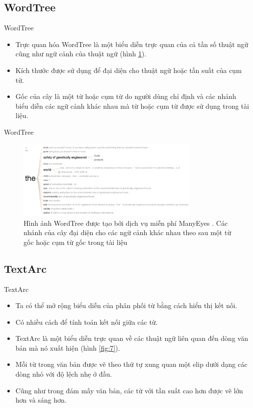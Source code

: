 \documentclass[10pt]{beamer}
\theoremstyle{remark}
\theoremstyle{definition}
\begin{document}
\subsection{WordTree}

\begin{frame}{WordTree}
	\begin{itemize}
		\item Trực quan hóa WordTree \cite{450} là một biểu diễn trực quan của cả tần số thuật ngữ cũng như ngữ cảnh của thuật ngữ (hình \ref{fig:6}).
		\item Kích thước được sử dụng để đại diện cho thuật ngữ hoặc tần suất của cụm từ.
		\item Gốc của cây là một từ hoặc cụm từ do người dùng chỉ định và các nhánh biểu diễn các ngữ cảnh khác nhau mà từ hoặc cụm từ được sử dụng trong tài liệu.
	\end{itemize}
\end{frame}

\begin{frame}{WordTree}
	\begin{figure}[h!]
        \centering
        \includegraphics[width=0.8\textwidth]{6.png}
        \caption{Hình ảnh WordTree được tạo bởi dịch vụ miễn phí ManyEyes \cite{196}.
        Các nhánh của cây đại diện cho các ngữ cảnh khác nhau theo sau một từ gốc hoặc cụm từ gốc trong tài liệu}
        \label{fig:6}
    \end{figure}
\end{frame}

\subsection{TextArc}

\begin{frame}{TextArc}
	\begin{itemize}
		\item Ta có thể mở rộng biểu diễn của phân phối từ bằng cách hiển thị kết nối.
		\item Có nhiều cách để tính toán kết nối giữa các từ.
		\item TextArc \cite{312} là một biểu diễn trực quan về các thuật ngữ liên quan đến dòng văn bản mà nó xuất hiện (hình \ref{fig:7}).
		\item Mỗi từ trong văn bản được vẽ theo thứ tự xung quan một elip dưới dạng các dòng nhỏ với độ lệch nhẹ ở đầu.
		\item Cũng như trong đám mấy văn bản, các từ với tần suất cao hơn được vẽ lớn hơn và sáng hơn.
	\end{itemize}
\end{frame}
\end{document}
